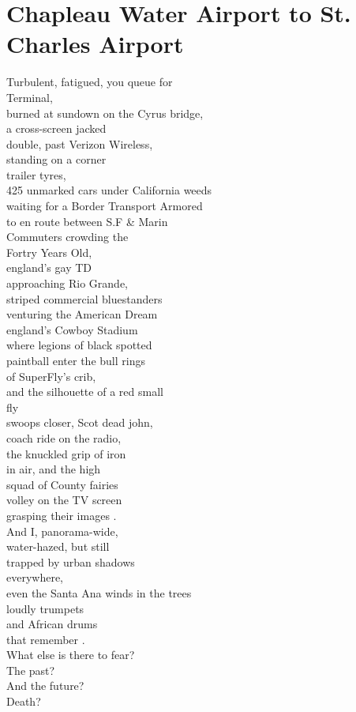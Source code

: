 \documentclass[smalldemyvopaper,11pt,twoside,onecolumn,openright,extrafontsizes]{memoir}
\begin{document}
\chapter{Chapleau Water Airport to St. Charles Airport}
Turbulent, fatigued, you queue for
\\Terminal,
\\burned at sundown on the Cyrus bridge,
\\a cross-screen jacked
\\double, past Verizon Wireless,
\\standing on a corner
\\trailer tyres,
\\425 unmarked cars under California weeds
\\waiting for a Border Transport Armored
\\to en route between S.F \& Marin
\\Commuters crowding the
\\Fortry Years Old,
\\england's gay TD
\\approaching Rio Grande,
\\striped commercial bluestanders
\\venturing the American Dream
\\england's Cowboy Stadium
\\where legions of black spotted
\\paintball enter the bull rings
\\of SuperFly's crib,
\\and the silhouette of a red small
\\fly
\\swoops closer, Scot dead john,
\\coach ride on the radio,
\\the knuckled grip of iron
\\in air, and the high
\\squad of County fairies
\\volley on the TV screen
\\grasping their images       .
\\And I, panorama-wide,
\\water-hazed, but still
\\trapped by urban shadows
\\everywhere,
\\even the Santa Ana winds in the trees
\\loudly trumpets
\\and African drums
\\that remember       .
\\What else is there to fear?
\\The past?
\\And the future?
\\Death?
\end{document}
